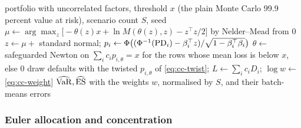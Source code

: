 \begin{algorithm}[htbp]
\caption{Importance sampling of the Gaussian copula loss by the exponential twist and a shifted factor.}
\label{alg:cc-is}
\begin{algorithmic}[1]
\Require portfolio with uncorrelated factors, threshold $x$ (the plain Monte Carlo 99.9 percent value at risk), scenario count $S$, seed
\State $\mu\gets\arg\max_z\big[-\theta(z)x+\ln M(\theta(z),z)-z^{\top}z/2\big]$ by Nelder--Mead from $0$
\State $z\gets\mu+$ standard normal; $p_i\gets\Phi\big((\Phi^{-1}(\mathrm{PD}_i)-\beta_i^{\top}z)/\sqrt{1-\beta_i^{\top}\beta_i}\big)$
\State $\theta\gets$ safeguarded Newton on $\sum_ic_ip_{i,\theta}=x$ for the rows whose mean loss is below $x$, else $0$
\State draw defaults with the twisted $p_{i,\theta}$ of \cref{eq:cc-twist}; $L\gets\sum_ic_iD_i$; $\log w\gets$ \cref{eq:cc-weight}
\EndFor
\State \Return $\widehat{\operatorname{VaR}},\widehat{\operatorname{ES}}$ with the weights $w$, normalised by $S$, and their batch-means errors
\end{algorithmic}
\end{algorithm}

\subsubsection{Euler allocation and concentration}

